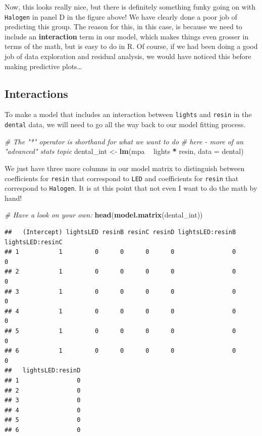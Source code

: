 \documentclass[
]{book}
\newenvironment{Shaded}{\begin{snugshade}}{\end{snugshade}}
\newcommand{\CommentTok}[1]{\textcolor[rgb]{0.56,0.35,0.01}{\textit{#1}}}
\newcommand{\DataTypeTok}[1]{\textcolor[rgb]{0.13,0.29,0.53}{#1}}
\newcommand{\KeywordTok}[1]{\textcolor[rgb]{0.13,0.29,0.53}{\textbf{#1}}}
\newcommand{\NormalTok}[1]{#1}
\newcommand{\OperatorTok}[1]{\textcolor[rgb]{0.81,0.36,0.00}{\textbf{#1}}}
\newcommand{\StringTok}[1]{\textcolor[rgb]{0.31,0.60,0.02}{#1}}
\begin{document}
Now, this looks really nice, but there is definitely something funky going on with \texttt{Halogen} in panel D in the figure above! We have clearly done a poor job of predicting this group. The reason for this, in this case, is because we need to include an \textbf{interaction} term in our model, which makes things even grosser in terms of the math, but is easy to do in R. Of course, if we had been doing a good job of data exploration and residual analysis, we would have noticed this before making predictive plots\ldots{}

\hypertarget{interactions}{%
\subsection{Interactions}\label{interactions}}

To make a model that includes an interaction between \texttt{lights} and \texttt{resin} in the \texttt{dental} data, we will need to go all the way back to our model fitting process.

\begin{Shaded}
\begin{Highlighting}[]
\CommentTok{# The "*" operator is shorthand for what we want to do}
\CommentTok{# here - more of an "advanced" stats topic}
\NormalTok{dental_int <-}\StringTok{ }\KeywordTok{lm}\NormalTok{(mpa }\OperatorTok{~}\StringTok{ }\NormalTok{lights }\OperatorTok{*}\StringTok{ }\NormalTok{resin, }\DataTypeTok{data =}\NormalTok{ dental)}
\end{Highlighting}
\end{Shaded}

We just have three more columns in our model matrix to distinguish between coefficients for \texttt{resin} that correspond to \texttt{LED} and coefficients for \texttt{resin} that correspond to \texttt{Halogen}. It is at this point that not even I want to do the math by hand!

\begin{Shaded}
\begin{Highlighting}[]
\CommentTok{# Have a look on your own:}
\KeywordTok{head}\NormalTok{(}\KeywordTok{model.matrix}\NormalTok{(dental_int))}
\end{Highlighting}
\end{Shaded}

\begin{verbatim}
##   (Intercept) lightsLED resinB resinC resinD lightsLED:resinB lightsLED:resinC
## 1           1         0      0      0      0                0                0
## 2           1         0      0      0      0                0                0
## 3           1         0      0      0      0                0                0
## 4           1         0      0      0      0                0                0
## 5           1         0      0      0      0                0                0
## 6           1         0      0      0      0                0                0
##   lightsLED:resinD
## 1                0
## 2                0
## 3                0
## 4                0
## 5                0
## 6                0
\end{verbatim}
\end{document}
